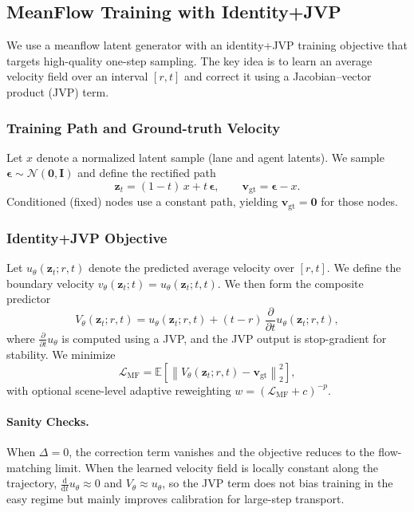 \documentclass{article}
\theoremstyle{plain}
\theoremstyle{definition}
\theoremstyle{remark}
\begin{document}
\subsection{MeanFlow Training with Identity+JVP}
\label{app:meanflow}

We use a meanflow latent generator with an identity+JVP training objective that targets high-quality one-step sampling. The key idea is to
learn an average velocity field over an interval \([r,t]\) and correct it using a Jacobian--vector product (JVP) term.

\subsubsection{Training Path and Ground-truth Velocity}

Let \(x\) denote a normalized latent sample (lane and agent latents). We sample \(\boldsymbol{\epsilon}\sim\mathcal{N}(\mathbf{0},\mathbf{I})\)
and define the rectified path
\[
\mathbf{z}_t = (1-t)\,x + t\,\boldsymbol{\epsilon},
\qquad
\mathbf{v}_{\mathrm{gt}} = \boldsymbol{\epsilon} - x.
\]
Conditioned (fixed) nodes use a constant path, yielding \(\mathbf{v}_{\mathrm{gt}}=\mathbf{0}\) for those nodes.

\subsubsection{Identity+JVP Objective}

Let \(u_{\theta}(\mathbf{z}_t;r,t)\) denote the predicted average velocity over \([r,t]\). We define the boundary velocity
\(v_{\theta}(\mathbf{z}_t;t)=u_{\theta}(\mathbf{z}_t;t,t)\). We then form the composite predictor
\[
V_{\theta}(\mathbf{z}_t;r,t)
=
u_{\theta}(\mathbf{z}_t;r,t)
+
(t-r)\,\frac{\partial}{\partial t}u_{\theta}(\mathbf{z}_t;r,t),
\]
where \(\frac{\partial}{\partial t}u_{\theta}\) is computed using a JVP, and the JVP output is stop-gradient for stability.
We minimize
\[
\mathcal{L}_{\mathrm{MF}}
=
\mathbb{E}\left[\left\lVert V_{\theta}(\mathbf{z}_t;r,t) - \mathbf{v}_{\mathrm{gt}} \right\rVert_2^2\right],
\]
with optional scene-level adaptive reweighting \(w=(\mathcal{L}_{\mathrm{MF}}+c)^{-p}\).


\paragraph{Sanity Checks.}
When \(\Delta=0\), the correction term vanishes and the objective reduces to the flow-matching limit. When the learned velocity field is locally constant along the trajectory, \(\frac{\mathrm{d}}{\mathrm{d}t}u_{\theta}\approx 0\) and \(V_{\theta}\approx u_{\theta}\), so the JVP term does not bias training in the easy regime but mainly improves calibration for large-step transport.
\end{document}
